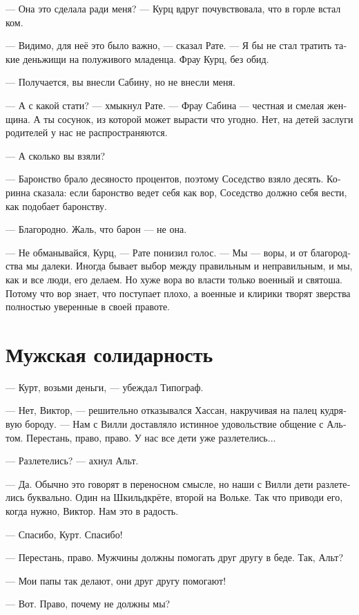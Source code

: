 \documentclass[a4paper,12pt,fleqn]{book}\usepackage{cooltooltips}\usepackage{polyglossia}\setdefaultlanguage[babelshorthands=true]{russian}\setotherlanguage{english}\defaultfontfeatures{Ligatures=TeX,Mapping=tex-text} \usepackage{xcolor}\definecolor{lightgray}{HTML}{bbbbbb}\color{lightgray}\newcommand{\ml}[3]{\textenglish{\textcolor{black}{#3}}}
\begin{document}
--- Она это сделала ради меня? --- Курц вдруг почувствовала, что в горле встал ком.

--- Видимо, для неё это было важно, --- сказал Рате.
--- Я бы не стал тратить такие деньжищи на полуживого младенца.
Фрау Курц, без обид.

--- Получается, вы внесли Сабину, но не внесли меня.

--- А с какой стати? --- хмыкнул Рате.
--- Фрау Сабина --- честная и смелая женщина.
А ты сосунок, из которой может вырасти что угодно.
Нет, на детей заслуги родителей у нас не распространяются.

--- А сколько вы взяли?

--- Баронство брало десяносто процентов, поэтому Соседство взяло десять.
Коринна сказала: если баронство ведет себя как вор, Соседство должно себя вести, как подобает баронству.

--- Благородно.
Жаль, что барон — не она.

--- Не обманывайся, Курц, --- Рате понизил голос.
--- Мы --- воры, и от благородства мы далеки.
Иногда бывает выбор между правильным и неправильным, и мы, как и все люди, его делаем.
Но хуже вора во власти только военный и святоша.
Потому что вор знает, что поступает плохо, а военные и клирики творят зверства полностью уверенные в своей правоте.

\section{Мужская солидарность}

--- Курт, возьми деньги, --- убеждал Типограф.

--- Нет, Виктор, --- решительно отказывался Хассан, накручивая на палец кудрявую бороду.
--- Нам с Вилли доставляло истинное удовольствие общение с Альтом.
Перестань, право, право.
У нас все дети уже разлетелись...

--- Разлетелись? --- ахнул Альт.

--- Да.
Обычно это говорят в переносном смысле, но наши с Вилли дети разлетелись буквально.
Один на Шкильдкрёте, второй на Вольке.
Так что приводи его, когда нужно, Виктор.
Нам это в радость.

--- Спасибо, Курт.
Спасибо!

--- Перестань, право.
Мужчины должны помогать друг другу в беде.
Так, Альт?

--- Мои папы так делают, они друг другу помогают!

--- Вот.
Право, почему не должны мы?
\end{document}
